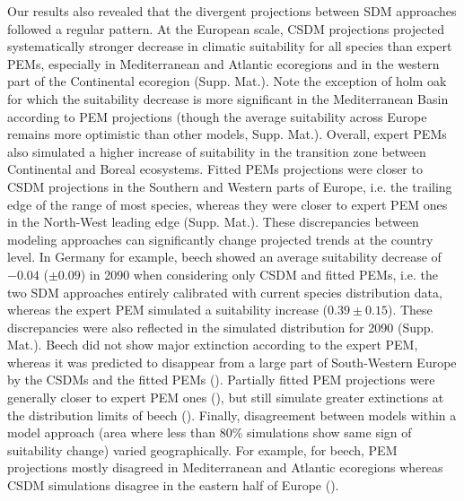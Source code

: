 \documentclass[letterpaper,8pt]{article}  %
\begin{document}
\begin{doublespacing}
\begin{linenumbers}
Our results also revealed that the divergent projections between SDM approaches followed a regular pattern. 
At the European scale, CSDM projections projected systematically stronger decrease in climatic suitability for all species than expert PEMs, especially in Mediterranean and Atlantic ecoregions and in the western part of the Continental ecoregion (Supp. Mat.). Note the exception of holm oak for which the suitability decrease is more significant in the Mediterranean Basin according to PEM projections (though the average suitability across Europe remains more optimistic than other models, Supp. Mat.). Overall, expert PEMs also simulated a higher increase of suitability in the transition zone between Continental and Boreal ecosystems. Fitted PEMs  projections were closer to CSDM projections in the Southern and Western parts of Europe, i.e. the trailing edge of the range of most species, whereas they were closer to expert PEM ones in the North-West leading edge (Supp. Mat.). These discrepancies between modeling approaches can significantly change projected trends at the country level. In Germany for example, beech showed an average suitability decrease of $-0.04$ ($\pm0.09$) in 2090 when considering only CSDM and fitted PEMs, i.e. the two SDM approaches entirely calibrated with current species distribution data, whereas the expert PEM simulated a suitability increase ($0.39\pm0.15$). These discrepancies were also reflected in the simulated distribution for 2090 (Supp. Mat.). Beech did not show major extinction according to the expert PEM, whereas it was predicted to disappear from a large part of South-Western Europe by the CSDMs and the fitted PEMs (). Partially fitted PEM projections were generally closer to expert PEM ones (), but still simulate greater extinctions at the distribution limits of beech ().
Finally, disagreement between models within a model approach (area where less than 80\% simulations show same sign of suitability change) varied geographically. For example, for beech, PEM projections mostly  disagreed in Mediterranean and Atlantic ecoregions whereas CSDM simulations disagree in the eastern half of Europe ().


\end{linenumbers}
\end{doublespacing}
\end{document}
